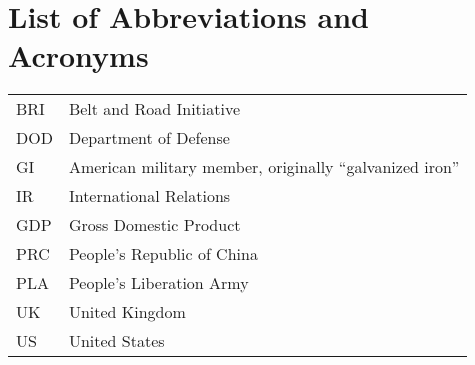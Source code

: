 



\section*{List of Abbreviations and Acronyms}

\begin{tabular}{ll}
	BRI & Belt and Road Initiative\\
	DOD & Department of Defense\\
	GI & American military member, originally ``galvanized iron''\\
	IR & International Relations\\
	GDP & Gross Domestic Product\\
	PRC & People's Republic of China\\
	PLA & People's Liberation Army\\
	UK & United Kingdom \\
	US & United States\\
\end{tabular}







